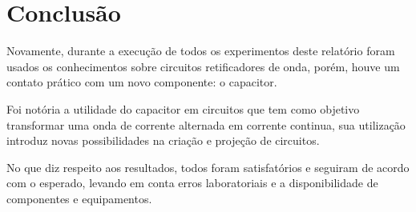 \chapter{Conclus\~{a}o}
Novamente, durante a execução de todos os experimentos deste relatório foram usados os conhecimentos sobre circuitos retificadores de onda, porém, houve um contato prático com um novo componente: o capacitor.

Foi notória a utilidade do capacitor em circuitos que tem como objetivo transformar uma onda de corrente alternada em corrente continua, sua utilização introduz novas possibilidades na criação e projeção de circuitos.

No que diz respeito aos resultados, todos foram satisfatórios e seguiram de acordo com o esperado, levando em conta erros laboratoriais e a disponibilidade de componentes e equipamentos. 
